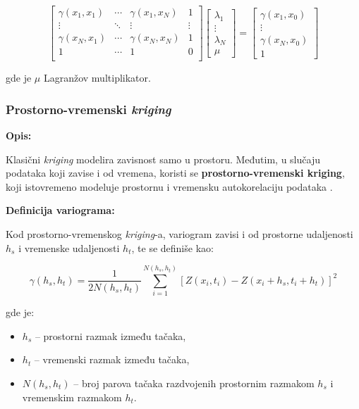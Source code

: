 \documentclass[12pt]{article}
\begin{document}
\begin{equation}
\begin{bmatrix}
\gamma(x_1,x_1) & \cdots & \gamma(x_1,x_N) & 1 \\
\vdots & \ddots & \vdots & \vdots \\
\gamma(x_N,x_1) & \cdots & \gamma(x_N,x_N) & 1 \\
1 & \cdots & 1 & 0 \\
\end{bmatrix}
\begin{bmatrix}
\lambda_1 \\ \vdots \\ \lambda_N \\ \mu
\end{bmatrix}
=
\begin{bmatrix}
\gamma(x_1,x_0) \\ \vdots \\ \gamma(x_N,x_0) \\ 1
\end{bmatrix}
\end{equation}

gde je $\mu$ Lagranžov multiplikator.

\subsubsection{Prostorno-vremenski \textit{kriging}}

\textbf{Opis:}

Klasični \textit{kriging} modelira zavisnost samo u prostoru. Međutim, u slučaju podataka koji zavise i od vremena, koristi se \textbf{prostorno-vremenski kriging}, koji istovremeno modeluje prostornu i vremensku autokorelaciju podataka \cite{gabriel1980spatio}.

\textbf{Definicija variograma:}

Kod prostorno-vremenskog \textit{kriging}-a, variogram zavisi i od prostorne udaljenosti $h_s$ i vremenske udaljenosti $h_t$, te se definiše kao:

\begin{equation}
\gamma(h_s,h_t) = \frac{1}{2N(h_s,h_t)} \sum_{i=1}^{N(h_s,h_t)} [Z(x_i,t_i) - Z(x_i + h_s, t_i + h_t)]^2
\end{equation}

gde je:
\begin{itemize}
    \item $h_s$ -- prostorni razmak između tačaka,
    \item $h_t$ -- vremenski razmak između tačaka,
    \item $N(h_s,h_t)$ -- broj parova tačaka razdvojenih prostornim razmakom $h_s$ i vremenskim razmakom $h_t$.
\end{itemize}
\end{document}
